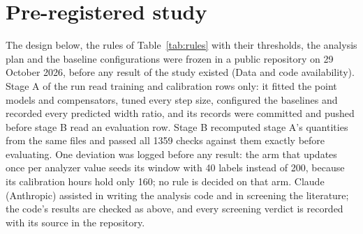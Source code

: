 \begin{table}[t]
\centering\footnotesize
\caption{The decided rules and their verdicts. Each rule was fixed with its threshold before any
result of the study existed (Section~\ref{sec:study}); a rule that fires removes or restricts the
claim it guards, and one that does not fire leaves it standing. The literature rule F4 fired
before the data and narrowed the claim on compensation to claim~2$'$
(Section~\ref{sec:remedies:comp}). F2 fires if neither primary cell shows a rise in $U$
over $\theta = 0$ of at least 1 percentage point (pp) with a 97.5\,\% interval above 0, and
restricts the diagnosis to the cell that shows it; F3 fires if 0.90 lies outside the Wilson
interval where the rise is shown; F5a and F5b if the mean $U$ exceeds 2\,\%; F6 if the mean error
of the predicted width ratio lies outside $\pm 10$\,\%; F7 if a baseline is valid and either it is
narrower or the loop is not valid; F8 if the 95\,\% interval of the paired difference in IACT does not lie wholly
below 0, and its step-size statement needs a larger compensated step in at least two operating
points and a smaller one in none. F1 is secondary and decides nothing.}
\label{tab:rules}

\end{table}

\section{Pre-registered study}\label{sec:study}

The design below, the rules of Table~\ref{tab:rules} with their thresholds, the analysis plan and
the baseline configurations were frozen in a public repository on 29 October 2026, before any
result of the study existed (Data and code availability). Stage A of the run read training and
calibration rows only: it fitted the point models and compensators, tuned every step size, configured the
baselines and recorded every predicted width ratio, and its records were committed and pushed
before stage B read an evaluation row. Stage B recomputed stage A's quantities from the same files
and passed all 1359 checks against them exactly before evaluating. One deviation was logged before
any result: the arm that updates once per analyzer value seeds its window with 40 labels instead
of 200, because its calibration hours hold only 160; no rule is decided on that arm. Claude
(Anthropic) assisted in writing the analysis code and in screening the literature; the code's
results are checked as above, and every screening verdict is recorded with its source in the
repository.

